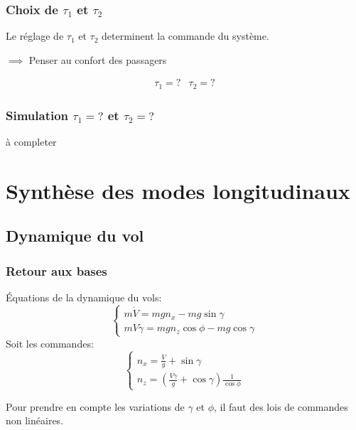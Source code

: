 \documentclass[footheight=2em]{beamer}
\begin{document}
\begin{frame}
    \frametitle{Choix de \( \tau_1 \) et \( \tau_2\)} \pause{}
    Le réglage de \( \tau_1 \) et \( \tau_2\) determinent la commande
    du système.\pause{}
    \begin{center}
        \( \implies \) Penser au confort des passagers
    \end{center}
    \pause{}
    \[
    \boxed{
    \begin{array}{ll}
        \tau_1 =  ? & \tau_2 = ?
    \end{array}
    }
    \]

\end{frame}

\begin{frame}
    \frametitle{Simulation \( \tau_1 = ? \) et \( \tau_2 = ? \)} \pause{}
    \begin{center}
        à completer
    \end{center}
\end{frame}

\section{Synthèse des modes longitudinaux}

\subsection{Dynamique du vol}

\begin{frame}
    \frametitle{Retour aux bases} \pause{}
    Équations de la dynamique du vols:
    \[
    \left \{
    \begin{array}{l}
        m \dot{V} = mg n_x - mg \sin \gamma \\
        m V \dot{\gamma} = mg n_z \cos \phi - mg \cos \gamma
    \end{array}
    \right.
    \]\pause{}
    Soit les commandes:
    \[
    \left \{
    \begin{array}{l}
        n_x = \frac{\dot{V}}{g} + \sin \gamma \\
        n_z = (\frac{V \dot{\gamma}}{g} + \cos \gamma) \frac{1}{\cos \phi}
    \end{array}
    \right.
    \]\pause{}
    \begin{center}
        Pour prendre en compte les variations de \( \gamma \) et \( \phi \), il
        faut des lois de commandes non linéaires.
    \end{center}
\end{frame}
\end{document}

